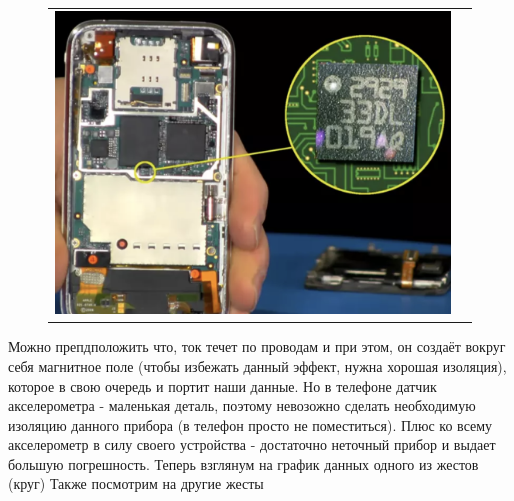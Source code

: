 \begin{figure}[H]
    \begin{center}
        \begin{tabular}{cc}
            \includegraphics[width=1\textwidth]{farim/im2} & 
        \end{tabular}
    \end{center}
\end{figure}
Можно препдположить что, 
ток течет по проводам и при этом, он создаёт вокруг себя магнитное поле 
(чтобы избежать данный эффект, нужна хорошая изоляция),
которое в свою очередь и портит наши данные.
Но в телефоне датчик акселерометра - маленькая деталь, поэтому 
невозожно сделать необходимую изоляцию данного прибора (в телефон просто не поместиться).
Плюс ко всему акселерометр в 
силу своего устройства - 
достаточно неточный прибор и выдает большую погрешность.
\newpage
Теперь взглянум на график данных одного из жестов (круг)
Также посмотрим на другие жесты 
